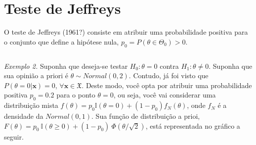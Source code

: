 \documentclass[
]{book}
\begin{document}
\(~\)

\(~\)

\hypertarget{teste-de-jeffreys}{%
\section{Teste de Jeffreys}\label{teste-de-jeffreys}}

O teste de Jeffreys (1961?) consiste em atribuir uma probabilidade positiva para o conjunto que define a hipótese nula, \(p_0=P(\theta \in \Theta_0)>0\).

\(~\)

\emph{Exemplo 2.} Suponha que deseja-se testar \(H_0: \theta=0\) contra \(H_1: \theta\neq 0\). Suponha que sua opinião a priori é \(\theta \sim Normal(0,2)\). Contudo, já foi visto que \(P(\theta=0|\boldsymbol x)=0\), \(\forall \boldsymbol x \in \mathfrak{X}\). Deste modo, você opta por atribuir uma probabilidade positiva \(p_0=0.2\) para o ponto \(\theta=0\), ou seja, você vai considerar uma distribuição mista \(f(\theta)=p_0\mathbb{I}(\theta=0)+(1-p_0)f_N(\theta)\), onde \(f_N\) é a densidade da \(Normal(0,1)\). Sua função de distribuição a prioi, \(F(\theta)=p_0~\mathbb{I}(\theta\geq0)+(1-p_0)~\Phi\left(\theta/\sqrt{2}\right)\), está representada no gráfico a seguir.
\end{document}
